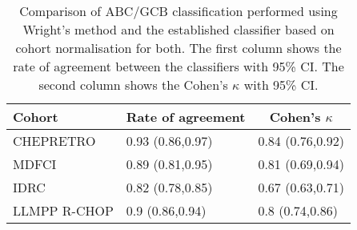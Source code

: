 \begin{table}
\small
\caption{Comparison of ABC/GCB classification performed using Wright's method and the established classifier based on cohort normalisation for both.
The first column shows the rate of agreement between the classifiers with 95\% CI.
The second column shows the Cohen's $\kappa$ with 95\% CI.\label{tab:ABCGCBclassifier}}
\begin{center}
\begin{tabular}{lll}
\hline\hline
\multicolumn{1}{l}{Cohort}&\multicolumn{1}{c}{Rate of agreement}&\multicolumn{1}{c}{Cohen's $\kappa$}\tabularnewline
\hline
CHEPRETRO&0.93 (0.86,0.97)&0.84 (0.76,0.92)\tabularnewline
MDFCI&0.89 (0.81,0.95)&0.81 (0.69,0.94)\tabularnewline
IDRC&0.82 (0.78,0.85)&0.67 (0.63,0.71)\tabularnewline
LLMPP R-CHOP&0.9 (0.86,0.94)&0.8 (0.74,0.86)\tabularnewline
\hline
\end{tabular}
\end{center}
\end{table}
